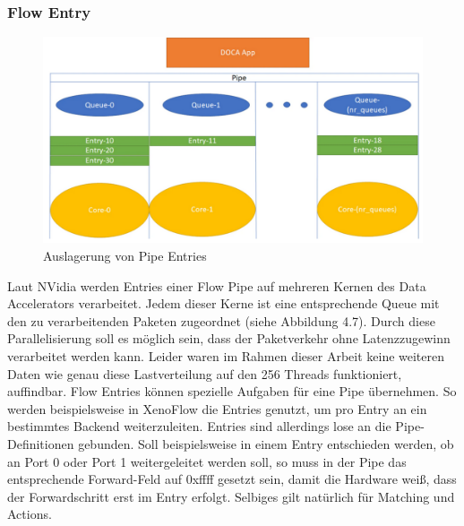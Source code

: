 \subsubsection{Flow Entry}
\begin{figure}
    \centering
    \includegraphics[width=1\linewidth]{images/entries.png}
    \caption{Auslagerung von Pipe Entries}
    \label{fig:enter-label}
\end{figure}
Laut NVidia werden Entries einer Flow Pipe auf mehreren Kernen des Data Accelerators verarbeitet. Jedem dieser Kerne ist eine entsprechende Queue mit den zu verarbeitenden Paketen zugeordnet  (siehe Abbildung 4.7). Durch diese Parallelisierung soll es möglich sein, dass der Paketverkehr ohne Latenzzugewinn verarbeitet werden kann. Leider waren im Rahmen dieser Arbeit keine weiteren Daten wie genau diese Lastverteilung auf den 256 Threads funktioniert, auffindbar. Flow Entries können spezielle Aufgaben für eine Pipe übernehmen. So werden beispielsweise in XenoFlow die Entries genutzt, um pro Entry an ein bestimmtes Backend weiterzuleiten. Entries sind allerdings lose an die Pipe-Definitionen gebunden. Soll beispielsweise in einem Entry entschieden werden, ob an Port 0 oder Port 1 weitergeleitet werden soll, so muss in der Pipe das entsprechende Forward-Feld auf 0xffff gesetzt sein, damit die Hardware weiß, dass der Forwardschritt erst im Entry erfolgt. Selbiges gilt natürlich für Matching und Actions.
